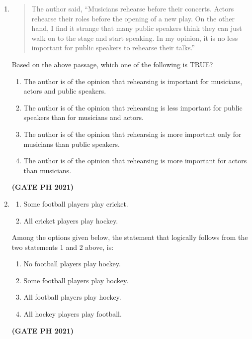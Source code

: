 \documentclass[14pt, a4paper]{extarticle}
\begin{document}
\begin{enumerate}[label=\textbf{Q.\arabic*}]
\item 
\begin{quote}
The author said, “Musicians rehearse before their concerts. Actors rehearse their roles before the opening of a new play. On the other hand, I find it strange that many public speakers think they can just walk on to the stage and start speaking. In my opinion, it is no less important for public speakers to rehearse their talks.”
\end{quote}
Based on the above passage, which one of the following is TRUE?
\begin{enumerate}
\item The author is of the opinion that rehearsing is important for musicians, actors and public speakers.
\item The author is of the opinion that rehearsing is less important for public speakers than for musicians and actors.
\item The author is of the opinion that rehearsing is more important only for musicians than public speakers.
\item The author is of the opinion that rehearsing is more important for actors than musicians.
\end{enumerate}
\hfill \textbf{(GATE PH 2021)}

\item
\begin{enumerate}
    \item Some football players play cricket.
    \item All cricket players play hockey.
\end{enumerate}
Among the options given below, the statement that logically follows from the two statements 1 and 2 above, is:
\begin{enumerate}
\item No football players play hockey.
\item Some football players play hockey.
\item All football players play hockey.
\item All hockey players play football.
\end{enumerate}
\hfill \textbf{(GATE PH 2021)}


\end{enumerate}
\end{document}
